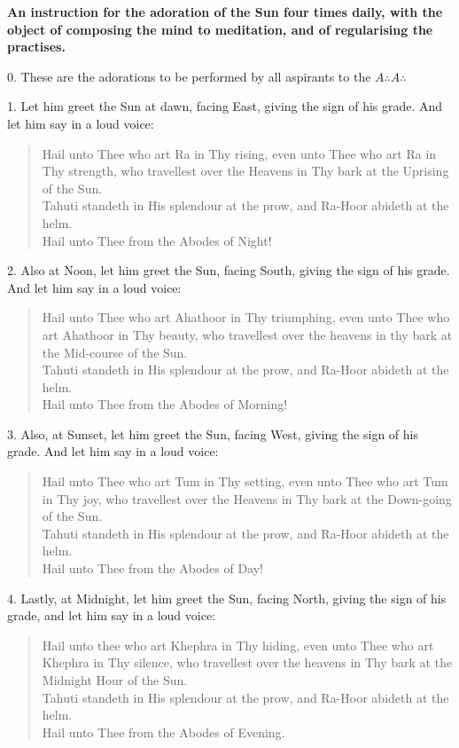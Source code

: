 
\textbf{An instruction for the adoration of the Sun four times daily, with the object of composing the mind to meditation, and of regularising the practises.}

0. These are the adorations to be performed by all aspirants to the $A\therefore{}A\therefore$

1. Let him greet the Sun at dawn, facing East, giving the sign of his grade. And let him say in a loud voice:

\begin{verse}
Hail unto Thee who art Ra in Thy rising, even unto Thee who art Ra in Thy strength, who travellest over the Heavens in Thy bark at the Uprising of the Sun.  \\
Tahuti standeth in His splendour at the prow, and Ra-Hoor abideth at the helm. \\
Hail unto Thee from the Abodes of Night!
\end{verse}

2. Also at Noon, let him greet the Sun, facing South, giving the sign of his grade. And let him say in a loud voice:

\begin{verse}
Hail unto Thee who art Ahathoor in Thy triumphing, even unto Thee who art Ahathoor in Thy beauty, who travellest over the heavens in thy bark at the Mid-course of the Sun. \\
Tahuti standeth in His splendour at the prow, and Ra-Hoor abideth at the helm. \\
Hail unto Thee from the Abodes of Morning!
\end{verse}

3. Also, at Sunset, let him greet the Sun, facing West, giving the sign of his grade. And let him say in a loud voice:
\begin{verse}
Hail unto Thee who art Tum in Thy setting, even unto Thee who art Tum in Thy joy, who travellest over the Heavens in Thy bark at the Down-going of the Sun. \\
Tahuti standeth in His splendour at the prow, and Ra-Hoor abideth at the helm. \\
Hail unto Thee from the Abodes of Day!
\end{verse}

4. Lastly, at Midnight, let him greet the Sun, facing North, giving the sign of his grade, and let him say in a loud voice:
\begin{verse}
Hail unto thee who art Khephra in Thy hiding, even unto Thee who art Khephra in Thy silence, who travellest over the heavens in Thy bark at the Midnight Hour of the Sun. \\
Tahuti standeth in His splendour at the prow, and Ra-Hoor abideth at the helm. \\
Hail unto Thee from the Abodes of Evening.
\end{verse}

